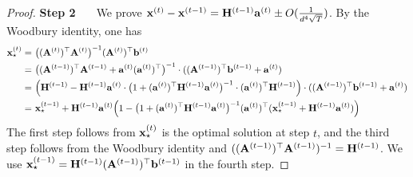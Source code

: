 \begin{proof}
\vspace{+2mm}
{\noindent \bf Step 2 \ \ } We prove $\mathbf{x}^{(t)} - \mathbf{x}^{(t-1)} = \mathbf{H}^{(t-1)} \mathbf{a}^{(t)} \pm O(\frac{1}{d^4\sqrt{T}})$.
By the Woodbury identity, one has
\begin{align}
\mathbf{x}_{\star}^{(t)} = &~ \big((\mathbf{A}^{(t)})^{\top}  \mathbf{A}^{(t)}\big)^{-1}(\mathbf{A}^{(t)})^{\top} \mathbf{b}^{(t)}\notag\\
=&~ \big((\mathbf{A}^{(t-1)})^{\top} \mathbf{A}^{(t-1)} +\mathbf{a}^{(t)} (\mathbf{a}^{(t)})^{\top}\big)^{-1} \cdot ((\mathbf{A}^{(t-1)})^{\top} \mathbf{b}^{(t-1)} + \mathbf{a}^{(t)})\notag\\
=&~ \Big(\mathbf{H}^{(t-1)} - \mathbf{H}^{(t-1)} \mathbf{a}^{(t)} \cdot \big(1+ (\mathbf{a}^{(t)})^{\top}\mathbf{H}^{(t-1)} \mathbf{a}^{(t)}\big)^{-1} \cdot (\mathbf{a}^{(t)})^{\top}\mathbf{H}^{(t-1)} \Big) \cdot ((\mathbf{A}^{(t-1)})^{\top} \mathbf{b}^{(t-1)} + \mathbf{a}^{(t)})\notag\\
=&~ \mathbf{x}_{\star}^{(t-1)} + \mathbf{H}^{(t-1)} \mathbf{a}^{(t)} \Big(1 - \big(1+ (\mathbf{a}^{(t)})^{\top}\mathbf{H}^{(t-1)} \mathbf{a}^{(t)}\big)^{-1} (\mathbf{a}^{(t)})^{\top} (\mathbf{x}_{\star}^{(t-1)} + \mathbf{H}^{(t-1)} \mathbf{a}^{(t)}) \Big)\label{eq:lower-step2}
\end{align}
The first step follows from $\mathbf{x}_{\star}^{(t)}$ is the optimal solution at step $t$, and the third step follows from the Woodbury identity and $((\mathbf{A}^{(t-1)})^{\top} \mathbf{A}^{(t-1)})^{-1} = \mathbf{H}^{(t-1)}$. We use $\mathbf{x}_{\star}^{(t-1)} = \mathbf{H}^{(t-1)} (\mathbf{A}^{(t-1)})^{\top} \mathbf{b}^{(t-1)}$ in the fourth step. 


\end{proof}
